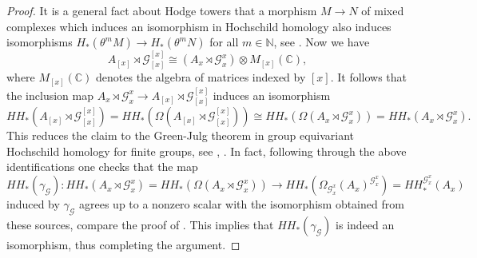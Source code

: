 \documentclass{amsart}
\newcommand{\G}{\mathcal{G}}
\begin{document}
\begin{proof}
It is a general fact about Hodge towers that a morphism $ M \rightarrow N $ of mixed complexes which induces an isomorphism in Hochschild homology also induces isomorphisms $ H_*(\theta^m M) \rightarrow H_*(\theta^m N) $ for all $ m \in \mathbb{N} $, see \cite{CUNTZ_QUILLEN_nonsingularity}. Now we have 
$$
A_{[x]} \rtimes \G_{[x]}^{[x]} \cong (A_x \rtimes \G^x_x) \otimes M_{[x]}(\mathbb{C}) , 
$$
where $ M_{[x]}(\mathbb{C}) $ denotes the algebra of matrices indexed by $ [x] $. It follows that the inclusion map $ A_x \rtimes \G^x_x \rightarrow A_{[x]} \rtimes \G_{[x]}^{[x]} $ 
induces an isomorphism
$$ 
HH_*(A_{[x]} \rtimes \G^{[x]}_{[x]}) = 
HH_*(\Omega(A_{[x]} \rtimes \G^{[x]}_{[x]})) \cong 
HH_*(\Omega(A_x \rtimes \G^x_x)) = HH_*(A_x \rtimes \G^x_x). 
$$
This reduces the claim to the Green-Julg theorem in group equivariant Hochschild homology for finite groups, see \cite{BRYLINSKI_brown}, \cite{BUES_thesis}. In fact, following through the above identifications one checks that the map 
$$
HH_*(\gamma_\G): HH_*(A_x \rtimes \G^x_x) = HH_*(\Omega(A_x \rtimes \G^x_x)) \rightarrow HH_*(\Omega_{\G^x_x}(A_x)^{\G_x^x}) = HH_*^{\G_x^x}(A_x)
$$
induced by $ \gamma_\G $ agrees up to a nonzero scalar with the isomorphism obtained from these sources, compare the proof of \cite[Theorem 4.3]{VOIGT_thesis}. This implies that $ HH_*(\gamma_\G) $ is indeed an isomorphism, thus completing the argument. 
\end{proof}





\end{document}
